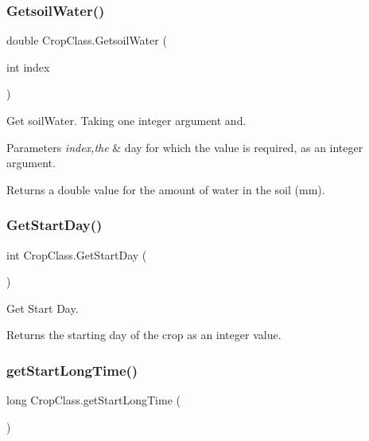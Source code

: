 \subsubsection{\texorpdfstring{GetsoilWater()}{GetsoilWater()}}
{\footnotesize\ttfamily double Crop\+Class.\+Getsoil\+Water (\begin{DoxyParamCaption}\item[{int}]{index }\end{DoxyParamCaption})\hspace{0.3cm}{\ttfamily [inline]}}



Get soil\+Water. Taking one integer argument and. 


\begin{DoxyParams}{Parameters}
{\em index,the} & day for which the value is required, as an integer argument. \\
\hline
\end{DoxyParams}
\begin{DoxyReturn}{Returns}
a double value for the amount of water in the soil (mm). 
\end{DoxyReturn}
\mbox{\label{class_crop_class_a7c4d2bbbac6e3080761d78f36529165f}} 
\subsubsection{\texorpdfstring{GetStartDay()}{GetStartDay()}}
{\footnotesize\ttfamily int Crop\+Class.\+Get\+Start\+Day (\begin{DoxyParamCaption}{ }\end{DoxyParamCaption})\hspace{0.3cm}{\ttfamily [inline]}}



Get Start Day. 

\begin{DoxyReturn}{Returns}
the starting day of the crop as an integer value. 
\end{DoxyReturn}
\mbox{\label{class_crop_class_a2198c46bc32446b73f21307b78547ecb}} 
\subsubsection{\texorpdfstring{getStartLongTime()}{getStartLongTime()}}
{\footnotesize\ttfamily long Crop\+Class.\+get\+Start\+Long\+Time (\begin{DoxyParamCaption}{ }\end{DoxyParamCaption})\hspace{0.3cm}{\ttfamily [inline]}}



